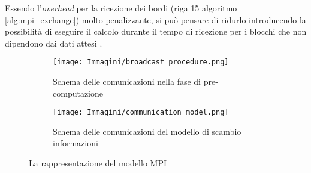 Essendo l'\textit{overhead} per la ricezione dei bordi (riga 15 algoritmo \ref{alg:mpi_exchange}) molto penalizzante, si può pensare di ridurlo introducendo la possibilità di eseguire il calcolo durante il tempo di ricezione per i blocchi che non dipendono dai dati attesi .
\begin{figure}[H]
\begin{subfigure}{0.5\textwidth}
	\centering
    \texttt{[image: Immagini/broadcast\_procedure.png]}
    \caption{Schema delle comunicazioni nella fase di pre-computazione}
	\label{fig:pre_proc_mpi}
\end{subfigure}%
\begin{subfigure}{0.5\textwidth}
	\centering
	\texttt{[image: Immagini/communication\_model.png]}
	\caption{Schema delle comunicazioni del modello di scambio informazioni}
	\label{fig:my_mpi_model}
\end{subfigure}
\caption{La rappresentazione del modello MPI}
\end{figure}